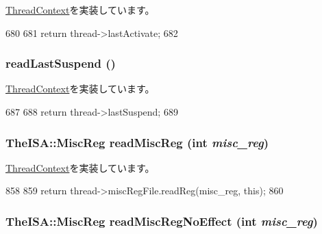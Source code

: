 \hyperlink{classThreadContext_a99574c7f076a26875232079962cbe522}{ThreadContext}を実装しています。


\begin{DoxyCode}
680 {
681     return thread->lastActivate;
682 }
\end{DoxyCode}
\hypertarget{classOzoneCPU_1_1OzoneTC_a7d0b0631c7087d361f6ae11379c06b15}{
\subsubsection[{readLastSuspend}]{ readLastSuspend ()}}
\label{classOzoneCPU_1_1OzoneTC_a7d0b0631c7087d361f6ae11379c06b15}


\hyperlink{classThreadContext_affe95ad96bb334a8132f9c69291f39a4}{ThreadContext}を実装しています。


\begin{DoxyCode}
687 {
688     return thread->lastSuspend;
689 }
\end{DoxyCode}
\hypertarget{classOzoneCPU_1_1OzoneTC_a34ce48319c94bd2802d790e830357b9c}{
\subsubsection[{readMiscReg}]{\setlength{\rightskip}{0pt plus 5cm}TheISA::MiscReg readMiscReg (int {\em misc\_\-reg})}}
\label{classOzoneCPU_1_1OzoneTC_a34ce48319c94bd2802d790e830357b9c}


\hyperlink{classThreadContext_a6888f4bff21e34892e59654ea80073b2}{ThreadContext}を実装しています。


\begin{DoxyCode}
858 {
859     return thread->miscRegFile.readReg(misc_reg, this);
860 }
\end{DoxyCode}
\hypertarget{classOzoneCPU_1_1OzoneTC_a1a9e07a956ef5a2611fe7cd590872097}{
\subsubsection[{readMiscRegNoEffect}]{\setlength{\rightskip}{0pt plus 5cm}TheISA::MiscReg readMiscRegNoEffect (int {\em misc\_\-reg})}}
\label{classOzoneCPU_1_1OzoneTC_a1a9e07a956ef5a2611fe7cd590872097}


